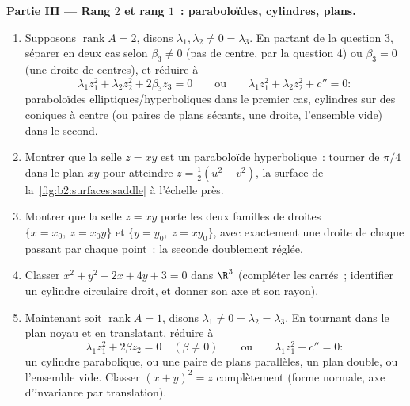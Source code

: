 \begin{problem}
\medskip
\noindent\textbf{Partie III --- Rang $2$ et rang $1$~:
paraboloïdes, cylindres, plans.}
\begin{enumerate}[resume]
  \item Supposons $\operatorname{rank}A = 2$, disons $\lambda_1,
        \lambda_2 \neq 0 = \lambda_3$. En partant de la question
        3, séparer en deux cas selon $\beta_3 \neq 0$
        (pas de centre, par la question 4) ou $\beta_3 = 0$ (une
        droite de centres), et réduire à
        \[
        \lambda_1z_1^2 + \lambda_2z_2^2 + 2\beta_3z_3 = 0
        \qquad\text{ou}\qquad
        \lambda_1z_1^2 + \lambda_2z_2^2 + c'' = 0 :
        \]
        paraboloïdes elliptiques/hyperboliques dans le premier cas,
        cylindres sur des coniques à centre (ou paires de
        plans sécants, une droite, l'ensemble vide) dans le
        second.
  \item Montrer que la selle $z = xy$ est un paraboloïde
        hyperbolique~: tourner de $\pi/4$ dans le plan $xy$ pour
        atteindre $z = \tfrac12(u^2 - v^2)$, la surface de
        la~\cref{fig:b2:surfaces:saddle} à l'échelle près.
  \item Montrer que la selle $z = xy$ porte les deux familles de
        droites $\{x = x_0,\ z = x_0y\}$ et $\{y = y_0,\ z
        = xy_0\}$, avec exactement une droite de chaque passant par
        chaque point~: la seconde  doublement réglée.
  \item Classer $x^2 + y^2 - 2x + 4y + 3 = 0$ dans $\R^3$
        (compléter les carrés~; identifier un cylindre circulaire
        droit, et donner son axe et son rayon).
  \item Maintenant soit $\operatorname{rank}A = 1$, disons $\lambda_1
        \neq 0 = \lambda_2 = \lambda_3$. En tournant dans le
        plan noyau et en translatant, réduire à
        \[
        \lambda_1z_1^2 + 2\beta z_2 = 0 \quad (\beta \neq 0)
        \qquad\text{ou}\qquad
        \lambda_1z_1^2 + c'' = 0 :
        \]
        un cylindre parabolique, ou une paire de plans parallèles, un
        plan double, ou l'ensemble vide. Classer $(x + y)^2 =
        z$ complètement (forme normale, axe d'invariance par
        translation).
\end{enumerate}


\end{problem}
